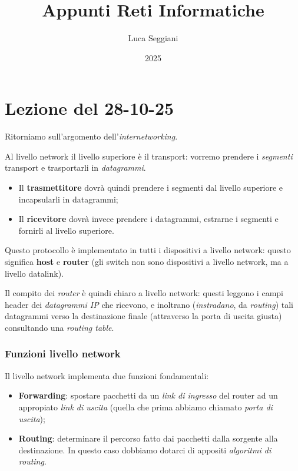 \documentclass[a4paper,11pt]{article}
\title{Appunti Reti Informatiche}
\author{Luca Seggiani}
\date{2025}
\begin{document}
\section{Lezione del 28-10-25}

\thispagestyle{empty}
\pagestyle{fancy}

Ritorniamo sull'argomento dell'\textit{internetworking}.

Al livello network il livello superiore è il transport: vorremo prendere i \textit{segmenti} transport e trasportarli in \textit{datagrammi}.

\begin{itemize}
	\item Il \textbf{trasmettitore} dovrà quindi prendere i segmenti dal livello superiore e incapsularli in datagrammi;
	\item Il \textbf{ricevitore} dovrà invece prendere i datagrammi, estrarne i segmenti e fornirli al livello superiore.
\end{itemize}

Questo protocollo è implementato in tutti i dispositivi a livello network: questo significa \textbf{host} e \textbf{router} (gli switch non sono dispositivi a livello network, ma a livello datalink).

Il compito dei \textit{router} è quindi chiaro a livello network: questi leggono i campi header dei \textit{datagrammi IP} che ricevono, e inoltrano (\textit{instradano}, da \textit{routing}) tali datagrammi verso la destinazione finale (attraverso la porta di uscita giusta) consultando una \textit{routing table}.

\subsubsection{Funzioni livello network}
Il livello network implementa due funzioni fondamentali:
\begin{itemize}
	\item \textbf{Forwarding}: spostare pacchetti da un \textit{link di ingresso} del router ad un appropiato \textit{link di uscita} (quella che prima abbiamo chiamato \textit{porta di uscita});
	\item \textbf{Routing}: determinare il percorso fatto dai pacchetti dalla sorgente alla destinazione. In questo caso dobbiamo dotarci di appositi \textit{algoritmi di routing}.
\end{itemize}
\end{document}
